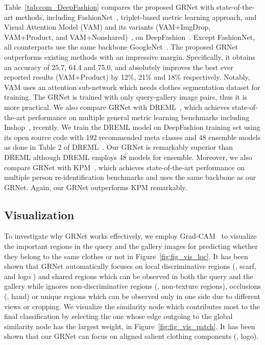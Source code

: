 \documentclass[10pt,twocolumn,letterpaper]{article}
\begin{document}
Table~\ref{tab:com_DeepFashion} compares the proposed GRNet with state-of-the-art methods, including FashionNet~\cite{Liu2016}, triplet-based metric learning approach, and Visual Attention Model (VAM) and its variants (VAM+ImgDrop, VAM+Product, and VAM+Nonshared)~\cite{Wang2018b}, on DeepFashion~\cite{Liu2016}.
Except FashionNet, all counterparts use the same backbone GoogleNet~\cite{Szegedy2014}.
The proposed GRNet outperforms existing methods with an impressive margin. Specifically, it obtains an accuracy of 25.7, 64.4  and 75.0, and absolutely improves the best ever reported results (VAM+Product) by 12\%, 21\% and 18\% respectively. Notably,  VAM uses an attention sub-network which needs clothes segmentation dataset for training. The GRNet is trained with only query-gallery image pairs, thus it is more practical.  We also compare GRNet with DREML~\cite{Xuan2018}, which achieves state-of-the-art performance on multiple general metric learning benchmarks including Inshop~\cite{Liu2016}, recently. We train the DREML model on DeepFashion training set using its open source code with 192 recommended meta classes and 48 ensemble models as done in Table 2 of DREML~\cite{Xuan2018}. Our GRNet is remarkably superior than DREML although DREML employs 48 models for ensemble.
Moreover, we also compare GRNet with KPM~\cite{Shen_2018_CVPR}, which achieves state-of-the-art performance on multiple person re-identification benchmarks and uses the same backbone as our GRNet.
Again, our GRNet outperforms KPM remarkably.
\subsection{Visualization}
To investigate why GRNet works effectively, we employ Grad-CAM~\cite{Selvaraju2017} to visualize the important regions in the query and the gallery images for predicting whether they belong to the same clothes or not in Figure~\ref{fig:fig_vis_loc}. It has been shown that GRNet automatically focuses on local discriminative regions (\eg, scarf, and logo ) and shared regions which can be observed in both the query and the gallery while ignores non-discriminative regions (\eg, non-texture regions), occlusions (\eg, hand) or unique regions which can be observed only in one side due to different views or cropping.
We visualize the similarity node which contributes most to the final classification by selecting the one whose edge outgoing to the global similarity node has the largest weight, in Figure~\ref{fig:fig_vis_patch}. It has been shown that our GRNet can focus on aligned salient clothing components (\eg, logo).
\end{document}

